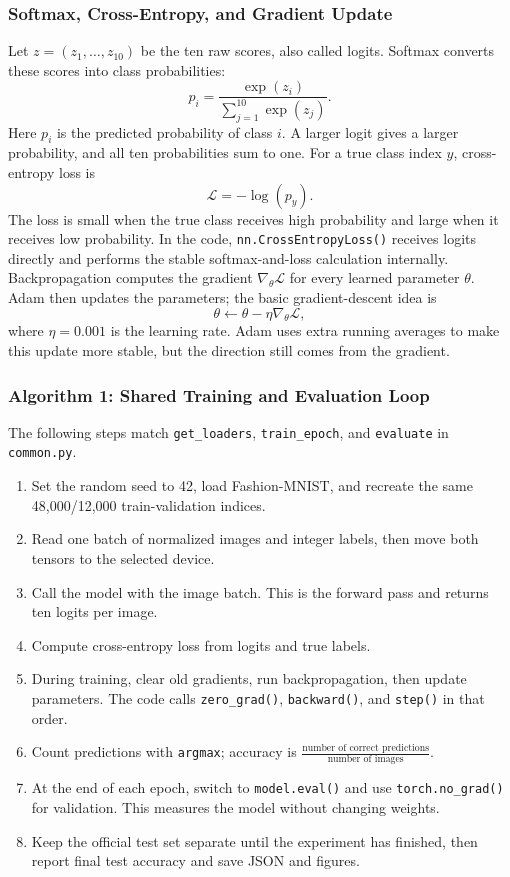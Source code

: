 \documentclass[oneside]{hcmut-report}
\begin{document}
\subsubsection*{Softmax, Cross-Entropy, and Gradient Update}
Let $z=(z_1,\ldots,z_{10})$ be the ten raw scores, also called logits. Softmax converts these scores into class probabilities:
\[
p_i=\frac{\exp(z_i)}{\sum_{j=1}^{10}\exp(z_j)}.
\]
Here $p_i$ is the predicted probability of class $i$. A larger logit gives a larger probability, and all ten probabilities sum to one. For a true class index $y$, cross-entropy loss is
\[
\mathcal{L}=-\log(p_y).
\]
The loss is small when the true class receives high probability and large when it receives low probability. In the code, \texttt{nn.CrossEntropyLoss()} receives logits directly and performs the stable softmax-and-loss calculation internally. Backpropagation computes the gradient $\nabla_\theta\mathcal{L}$ for every learned parameter $\theta$. Adam then updates the parameters; the basic gradient-descent idea is
\[
\theta\leftarrow\theta-\eta\nabla_\theta\mathcal{L},
\]
where $\eta=0.001$ is the learning rate. Adam uses extra running averages to make this update more stable, but the direction still comes from the gradient.

\subsubsection*{Algorithm 1: Shared Training and Evaluation Loop}
The following steps match \texttt{get\_loaders}, \texttt{train\_epoch}, and \texttt{evaluate} in \texttt{common.py}.
\begin{enumerate}[leftmargin=8mm]
  \item Set the random seed to 42, load Fashion-MNIST, and recreate the same 48,000/12,000 train-validation indices.
  \item Read one batch of normalized images and integer labels, then move both tensors to the selected device.
  \item Call the model with the image batch. This is the forward pass and returns ten logits per image.
  \item Compute cross-entropy loss from logits and true labels.
  \item During training, clear old gradients, run backpropagation, then update parameters. The code calls \texttt{zero\_grad()}, \texttt{backward()}, and \texttt{step()} in that order.
  \item Count predictions with \texttt{argmax}; accuracy is $\frac{\text{number of correct predictions}}{\text{number of images}}$.
  \item At the end of each epoch, switch to \texttt{model.eval()} and use \texttt{torch.no\_grad()} for validation. This measures the model without changing weights.
  \item Keep the official test set separate until the experiment has finished, then report final test accuracy and save JSON and figures.
\end{enumerate}
\end{document}
